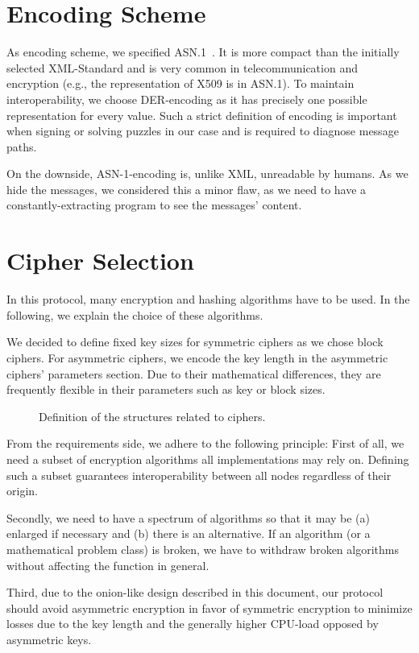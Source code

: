\section{Encoding Scheme}
As encoding scheme, we specified ASN.1~\cite{dis19878824}. It is more compact than the initially selected XML-Standard and is very common in telecommunication and encryption (e.g., the representation of X509 is in ASN.1). To maintain interoperability, we choose DER-encoding as it has precisely one possible representation for every value. Such a strict definition of encoding is important when signing or solving puzzles in our case and is required to diagnose message paths.

On the downside, ASN-1-encoding is, unlike XML, unreadable by humans. As we hide the messages, we considered this a minor flaw, as we need to have a constantly-extracting program to see the messages' content.

\section{Cipher Selection}
In this protocol, many encryption and hashing algorithms have to be used. In the following, we explain the choice of these algorithms. 

We decided to define fixed key sizes for symmetric ciphers as we chose block ciphers. For asymmetric ciphers, we encode the key length in the asymmetric ciphers' parameters section. Due to their mathematical differences, they are frequently flexible in their parameters such as key or block sizes. 

\begin{figure}[ht]
	
	\caption{Definition of the structures related to ciphers.}
	\label{fig:defCiphers}
\end{figure}

From the requirements side, we adhere to the following principle:
First of all, we need a subset of encryption algorithms all implementations may rely on. Defining such a subset guarantees interoperability between all nodes regardless of their origin. 

Secondly, we need to have a spectrum of algorithms so that it may be (a) enlarged if necessary and (b) there is an alternative. If an algorithm (or a mathematical problem class) is broken, we have to withdraw broken algorithms without affecting the function in general. 

Third, due to the onion-like design described in this document, our protocol should avoid asymmetric encryption in favor of symmetric encryption to minimize losses due to the key length and the generally higher CPU-load opposed by asymmetric keys.

